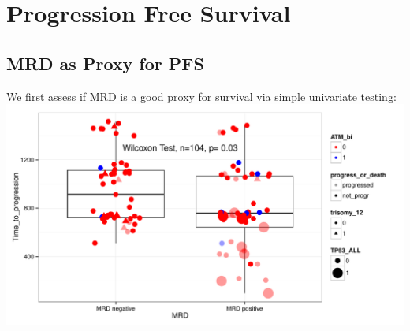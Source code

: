 \documentclass[a4paper,11pt]{article}
\begin{document}
% 
% 
% 

\section{Progression Free Survival}

\subsection{MRD as Proxy for PFS}
We first assess if MRD is a good proxy for survival via simple univariate testing:\\
\includegraphics{HICF1_Finalreportv6-025}
\end{document}
